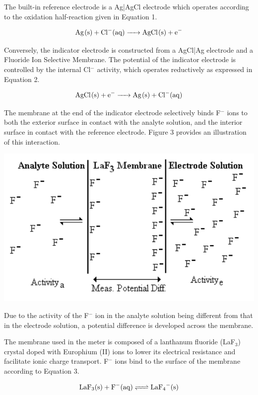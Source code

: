 \documentclass{article}
\begin{document}
The built-in reference electrode is a Ag|AgCl electrode which operates according
to the oxidation half-reaction given in Equation 1.
\begin{center}
    \begin{equation}
        \ce {Ag(s) + Cl-(aq) -> AgCl(s) + e-}
    \end{equation}
\end{center}
Conversely, the indicator electrode is constructed from a AgCl|Ag electrode and a Fluoride
Ion Selective Membrane. 
The potential of the indicator electrode is controlled by the internal Cl$^-$
activity, which operates reductively as expressed in Equation 2.
\begin{center}
    \begin{equation}
        \ce {AgCl(s) + e- -> Ag(s) + Cl-(aq)}
    \end{equation}
\end{center}

The membrane at the end of the indicator electrode selectively binds F$^-$ ions to both the exterior surface in
contact with the analyte solution, and the interior surface in contact with the
reference electrode. Figure 3 provides an illustration of this interaction.
\begin{center}
    \includegraphics[scale=0.6]{membrane}
\end{center}

Due to the activity of the F$^-$ ion in the analyte solution being different from
that in the electrode solution, a potential difference is developed across the
membrane. 

The membrane used in the meter is composed of a lanthanum fluoride (LaF$_3$)
crystal doped with Europhium (II) ions to lower its electrical resistance and
facilitate ionic charge transport. \cite{nmt}
F$^-$ ions bind to the surface of the membrane according to Equation 3.
\begin{center}
    \begin{equation}
        \ce {LaF3(s) + F^-(aq) <=> LaF4^-(s)}
    \end{equation}
\end{center}
\end{document}
